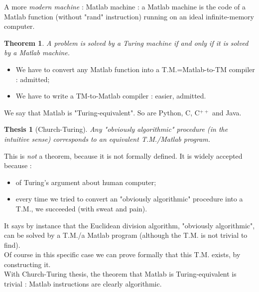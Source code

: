 \documentclass[12pt,a4paper]{report}
\theoremstyle{break}
\newtheorem{theorem}{Theorem}
\newtheorem{thesis}{Thesis}
\newenvironment{proof}[1][Proof]{\begin{trivlist}
\item[\hskip \labelsep {\bfseries #1}]}{\end{trivlist}}
\begin{document}
A more \emph{modern machine} : Matlab machine : a Matlab machine is the code of a Matlab function (without "rand" instruction) running on an ideal infinite-memory computer.\\

\begin{theorem}

A problem is solved by a Turing machine if and only if it is solved by a Matlab machine.
\end{theorem}
\begin{proof}
\hfill
\begin{itemize}
\item[{\color{cyan}\fbox{$\Leftarrow$}}]  We have to convert any Matlab function into a T.M.=Matlab-to-TM compiler : admitted;
\item[{\color{cyan}\fbox{$\Rightarrow$}}] We have to write a TM-to-Matlab compiler : easier, admitted.
\end{itemize}
\end{proof}

We say that Matlab is "Turing-equivalent". So are Python, C, C$^{++}$ and Java.\\

\begin{thesis}[Church-Turing]
Any "obviously algorithmic" procedure (in the intuitive sense) corresponds to an equivalent T.M./Matlab program.
\end{thesis}
This is \emph{not} a theorem, because it is not formally defined. It is widely accepted because : 
\begin{itemize}
\item[$\bullet$] of Turing's argument about human computer;
\item[$\bullet$] every time we tried to convert an "obviously algorithmic" procedure into a T.M., we succeeded (with sweat and pain).\\
\end{itemize} 

It says by instance that the Euclidean division algorithm, "obviously algorithmic", can be solved by a T.M./a Matlab program (although the T.M. is not trivial to find).\\
Of course in this specific case we can prove formally that this T.M. exists, by constructing it.\\

With Church-Turing thesis, the theorem that Matlab is Turing-equivalent is trivial : Matlab instructions are clearly algorithmic.\\
\end{document}
